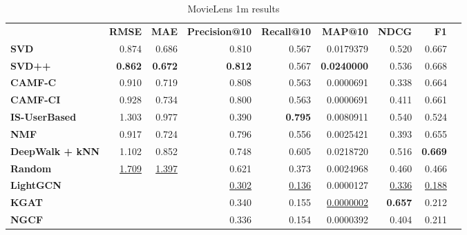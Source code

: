 \begin{table}[!htp]\centering
\caption{MovieLens 1m results}\label{tab:ml1mtable}
\scriptsize
\begin{tabular}{lrrrrrrrr}\toprule
&\textbf{RMSE} &\textbf{MAE} &\textbf{Precision@10} &\textbf{Recall@10} &\textbf{MAP@10} &\textbf{NDCG} &\textbf{F1} \\\cmidrule{2-8}
\textbf{SVD} &0.874 &0.686 &0.810 &0.567 &0.0179379 &0.520 &0.667 \\\cmidrule{1-8}
\textbf{SVD++} &\textbf{0.862} &\textbf{0.672} &\textbf{0.812} &0.567 &\textbf{0.0240000} &0.536 &0.668 \\\cmidrule{1-8}
\textbf{CAMF-C} &0.910 &0.719 &0.808 &0.563 &0.0000691 &0.338 &0.664 \\\cmidrule{1-8}
\textbf{CAMF-CI} &0.928 &0.734 &0.800 &0.563 &0.0000691 &0.411 &0.661 \\\cmidrule{1-8}
\textbf{IS-UserBased} &1.303 &0.977 &0.390 &\textbf{0.795} &0.0080911 &0.540 &0.524 \\\cmidrule{1-8}
\textbf{NMF} &0.917 &0.724 &0.796 &0.556 &0.0025421 &0.393 &0.655 \\\cmidrule{1-8}
\textbf{DeepWalk + kNN} &1.102 &0.852 &0.748 &0.605 &0.0218720 &0.516 &\textbf{0.669} \\\cmidrule{1-8}
\textbf{Random} &\ul{1.709} &\ul{1.397} &0.621 &0.373 &0.0024968 &0.460 &0.466 \\\cmidrule{1-8}
\textbf{LightGCN} & & &\ul{0.302} &\ul{0.136} &0.0000127 &\ul{0.336} &\ul{0.188} \\\cmidrule{1-1}\cmidrule{1-8}
\textbf{KGAT} & & &0.340 &0.155 &\ul{0.0000002} &\textbf{0.657} &0.212 \\\midrule
\textbf{NGCF} & & &0.336 &0.154 &0.0000392 &0.404 &0.211 \\
\bottomrule
\end{tabular}
\end{table}